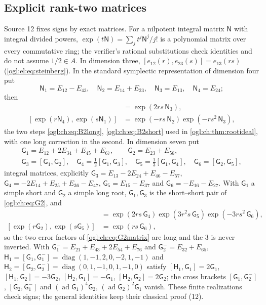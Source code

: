 \documentclass[11pt,oneside]{article}
\numberwithin{equation}{section}
\theoremstyle{definition}
\theoremstyle{remark}
\newcommand{\diag}{\operatorname{diag}}
\begin{document}
\subsection{Explicit rank-two matrices}\label{ogl:ch:sub:matrices}
Source 12 fixes signs by exact matrices. For a nilpotent integral matrix
$\mathsf N$ with integral divided powers, $\exp(t\mathsf N)=\sum_j t^j\mathsf N^j/j!$ is a
polynomial matrix over every commutative ring; the verifier's rational
substitutions check identities and do not assume $1/2\in A$. In dimension three,
$[e_{12}(r),e_{23}(s)]=e_{13}(rs)$ (\eqref{ogl:el:eq:steinberg}). In the
standard symplectic representation of dimension four put
\[
 \mathsf N_1=E_{12}-E_{43},\quad \mathsf N_2=E_{14}+E_{23},\quad
 \mathsf N_3=E_{13},\quad \mathsf N_4=E_{24};
\]
then
\begin{align}
 [\exp(r\mathsf N_1),\exp(s\mathsf N_2)]&=\exp(2rs\,\mathsf N_3),\label{ogl:ch:eq:C2long}\\
 [\exp(r\mathsf N_4),\exp(s\mathsf N_1)]&=\exp(-rs\,\mathsf N_2)\exp(-rs^2\,\mathsf N_3),\label{ogl:ch:eq:C2short}
\end{align}
the two steps \eqref{ogl:ch:eq:B2long}, \eqref{ogl:ch:eq:B2short} used in
\cref{ogl:ch:thm:rootideal}, with one long correction in the second. In dimension
seven put
\begin{gather*}
 \mathsf G_1=E_{12}+2E_{34}+E_{45}+E_{67},\qquad
 \mathsf G_2=E_{23}+E_{56},\\
 \mathsf G_3=[\mathsf G_1,\mathsf G_2],\quad
 \mathsf G_4=\tfrac12[\mathsf G_1,\mathsf G_3],\quad
 \mathsf G_5=\tfrac13[\mathsf G_1,\mathsf G_4],\quad
 \mathsf G_6=[\mathsf G_2,\mathsf G_5],
\end{gather*}
integral matrices, explicitly
$\mathsf G_3=E_{13}-2E_{24}+E_{46}-E_{57}$,
$\mathsf G_4=-2E_{14}+E_{25}+E_{36}-E_{47}$,
$\mathsf G_5=E_{15}-E_{37}$ and $\mathsf G_6=-E_{16}-E_{27}$. With $\mathsf G_1$ a simple
short and $\mathsf G_2$ a simple long root, $\mathsf G_1,\mathsf G_3$ is the short--short
pair of \eqref{ogl:ch:eq:G2}, and
\begin{align}
 [\exp(r\mathsf G_1),\exp(s\mathsf G_3)]&=\exp(2rs\,\mathsf G_4)\exp(3r^2s\,\mathsf G_5)\exp(-3rs^2\,\mathsf G_6),\label{ogl:ch:eq:G2matrix}\\
 [\exp(r\mathsf G_2),\exp(s\mathsf G_5)]&=\exp(rs\,\mathsf G_6),\label{ogl:ch:eq:G2matrixlong}
\end{align}
so the two error factors of \eqref{ogl:ch:eq:G2matrix} are long and the $3$ is
never inverted. With $\mathsf G_1^-=E_{21}+E_{43}+2E_{54}+E_{76}$ and
$\mathsf G_2^-=E_{32}+E_{65}$, $\mathsf H_1=[\mathsf G_1,\mathsf G_1^-]=\diag(1,-1,2,0,-2,1,-1)$ and
$\mathsf H_2=[\mathsf G_2,\mathsf G_2^-]=\diag(0,1,-1,0,1,-1,0)$ satisfy
$[\mathsf H_1,\mathsf G_1]=2\mathsf G_1$, $[\mathsf H_1,\mathsf G_2]=-3\mathsf G_2$,
$[\mathsf H_2,\mathsf G_1]=-\mathsf G_1$, $[\mathsf H_2,\mathsf G_2]=2\mathsf G_2$; the
cross brackets $[\mathsf G_1,\mathsf G_2^-]$, $[\mathsf G_2,\mathsf G_1^-]$ and
$(\operatorname{ad}\mathsf G_1)^4\mathsf G_2$, $(\operatorname{ad}\mathsf G_2)^2\mathsf G_1$
vanish. These finite realizations check signs; the general identities keep their
classical proof (12).
\end{document}
